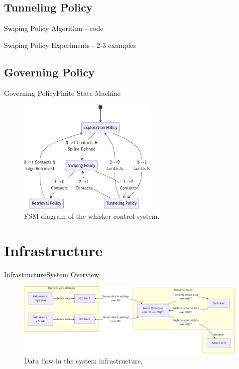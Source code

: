 \documentclass[AIRbeamer
,optEnglish
,optBiber
,optBibstyleAlphabetic
,optBeamerClassicFormat%
]{AIRlatex}
\begin{document}
    \subsection{Tunneling Policy}
    \begin{frame}{Swiping Policy Algorithm}
        - code
    \end{frame}
    \begin{frame}{Swiping Policy Experiments}
        - 2-3 examples
    \end{frame}

    \subsection{Governing Policy}
    \begin{frame}{Governing Policy}{Finite State Machine}
        \begin{figure}[H]
            \centering
            \includegraphics[width=0.6\textwidth]{figures/fsm}
            \caption{FSM diagram of the whisker control system.}
        \end{figure}
    \end{frame}


    \section{Infrastructure}
    \begin{frame}{Infrastructure}{System Overview}
        \begin{figure}[H]
            \centering
            \includegraphics[width=\textwidth]{figures/infrastructure-overview}
            \caption{Data flow in the system infrastructure.}
        \end{figure}
    \end{frame}
\end{document}
